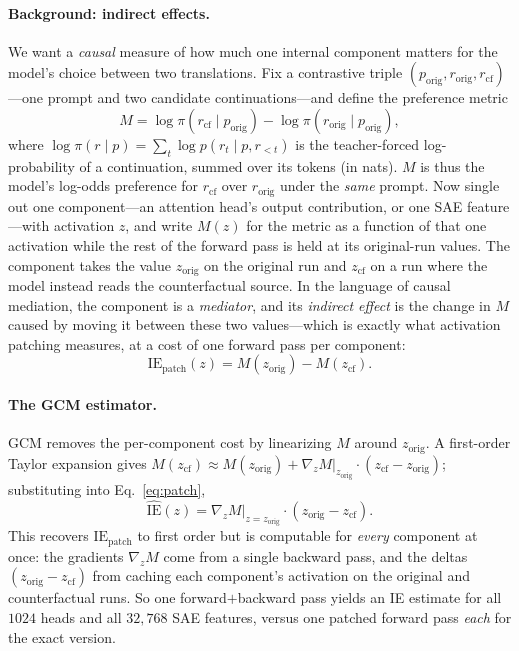 \documentclass[11pt]{article}
\begin{document}
\paragraph{Background: indirect effects.} We want a \emph{causal} measure of how
much one internal component matters for the model's choice between two
translations. Fix a contrastive triple $(p_{\text{orig}}, r_{\text{orig}},
r_{\text{cf}})$---one prompt and two candidate continuations---and define the
preference metric
\begin{equation}
M = \log \pi(r_{\text{cf}}\mid p_{\text{orig}}) - \log \pi(r_{\text{orig}}\mid p_{\text{orig}}),
\label{eq:metric}
\end{equation}
where $\log\pi(r\mid p) = \sum_t \log p(r_t \mid p, r_{<t})$ is the
teacher-forced log-probability of a continuation, summed over its tokens (in
nats). $M$ is thus the model's log-odds preference for $r_{\text{cf}}$ over
$r_{\text{orig}}$ under the \emph{same} prompt. Now single out one component---an
attention head's output contribution, or one SAE feature---with activation $z$,
and write $M(z)$ for the metric as a function of that one activation while the
rest of the forward pass is held at its original-run values. The component takes
the value $z_{\text{orig}}$ on the original run and $z_{\text{cf}}$ on a run
where the model instead reads the counterfactual source. In the language of
causal mediation, the component is a \emph{mediator}, and its \emph{indirect
effect} is the change in $M$ caused by moving it between these two values---which
is exactly what activation patching measures, at a cost of one forward pass per
component:
\begin{equation}
\mathrm{IE}_{\text{patch}}(z) = M(z_{\text{orig}}) - M(z_{\text{cf}}).
\label{eq:patch}
\end{equation}

\paragraph{The GCM estimator.} GCM \citep{sankaranarayanan2026gcm} removes the
per-component cost by linearizing $M$ around $z_{\text{orig}}$. A first-order
Taylor expansion gives $M(z_{\text{cf}}) \approx M(z_{\text{orig}}) + \nabla_z
M|_{z_{\text{orig}}}\!\cdot(z_{\text{cf}} - z_{\text{orig}})$; substituting into
Eq.~\ref{eq:patch},
\begin{equation}
\widehat{\mathrm{IE}}(z) = \nabla_z M\big|_{z=z_{\text{orig}}} \cdot (z_{\text{orig}} - z_{\text{cf}}).
\label{eq:ie}
\end{equation}
This recovers $\mathrm{IE}_{\text{patch}}$ to first order but is computable for
\emph{every} component at once: the gradients $\nabla_z M$ come from a single
backward pass, and the deltas $(z_{\text{orig}} - z_{\text{cf}})$ from caching
each component's activation on the original and counterfactual runs. So one
forward$+$backward pass yields an IE estimate for all $1024$ heads and all
$32{,}768$ SAE features, versus one patched forward pass \emph{each} for the
exact version.
\end{document}
